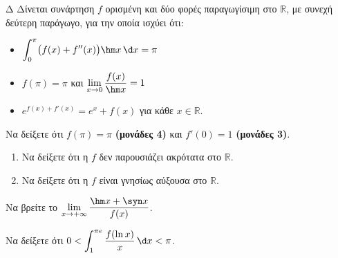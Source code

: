 \begin{thema}{Δ}
Δίνεται συνάρτηση $f$ ορισμένη και δύο φορές παραγωγίσιμη στο $\mathbb{R}$, με συνεχή δεύτερη παράγωγο, για την οποία ισχύει ότι:
\begin{itemize}
    \item $\displaystyle\int_0^{\pi} \bigl(f(x) + f''(x)\bigr) \hm x\,\d x = \pi$
    \item $f(\pi) = \pi$ και $\displaystyle\lim_{x \to 0} \dfrac{f(x)}{\hm x} = 1$
    \item $e^{f(x)+f'(x)} = e^x + f(x)$ για κάθε $x \in \mathbb{R}$.
\end{itemize}
\begin{erwthma}
    \item Να δείξετε ότι $f(\pi) = \pi$ \textbf{(μονάδες 4)} και $f'(0) = 1$ \textbf{(μονάδες 3)}. 
    \item
    \begin{enumerate}[label=\alph*)]
        \item Να δείξετε ότι η $f$ δεν παρουσιάζει ακρότατα στο $\mathbb{R}$. 
        \item Να δείξετε ότι η $f$ είναι γνησίως αύξουσα στο $\mathbb{R}$. 
    \end{enumerate}
    \item Να βρείτε το $\displaystyle\lim_{x \to +\infty} \dfrac{\hm x + \syn x}{f(x)}$. 
    \item Να δείξετε ότι $0 < \displaystyle\int_1^{\pi e} \dfrac{f(\ln x)}{x}\,\d x < \pi$. 
\end{erwthma}
\end{thema}
